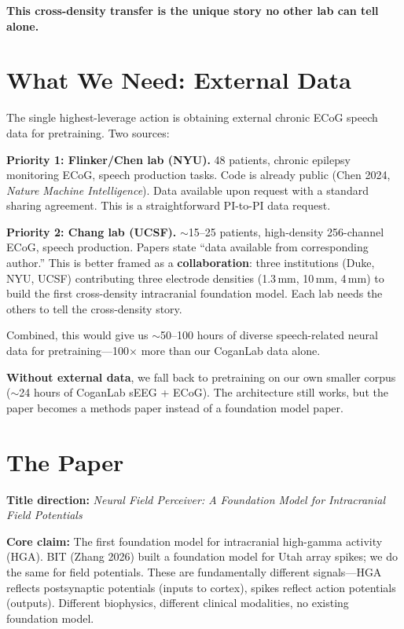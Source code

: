\documentclass[11pt,letterpaper]{article}
\begin{document}
\textbf{This cross-density transfer is the unique story no other lab can tell alone.}


\section{What We Need: External Data}

The single highest-leverage action is obtaining external chronic ECoG speech data for pretraining. Two sources:

\textbf{Priority 1: Flinker/Chen lab (NYU).} 48 patients, chronic epilepsy monitoring ECoG, speech production tasks. Code is already public (Chen 2024, \textit{Nature Machine Intelligence}). Data available upon request with a standard sharing agreement. This is a straightforward PI-to-PI data request.

\textbf{Priority 2: Chang lab (UCSF).} ${\sim}$15--25 patients, high-density 256-channel ECoG, speech production. Papers state ``data available from corresponding author.'' This is better framed as a \textbf{collaboration}: three institutions (Duke, NYU, UCSF) contributing three electrode densities (1.3\,mm, 10\,mm, 4\,mm) to build the first cross-density intracranial foundation model. Each lab needs the others to tell the cross-density story.

Combined, this would give us ${\sim}$50--100 hours of diverse speech-related neural data for pretraining---100$\times$ more than our CoganLab data alone.

\textbf{Without external data}, we fall back to pretraining on our own smaller corpus (${\sim}$24 hours of CoganLab sEEG + \textmu ECoG). The architecture still works, but the paper becomes a methods paper instead of a foundation model paper.


\section{The Paper}

\textbf{Title direction:} \textit{Neural Field Perceiver: A Foundation Model for Intracranial Field Potentials}

\textbf{Core claim:} The first foundation model for intracranial high-gamma activity (HGA). BIT (Zhang 2026) built a foundation model for Utah array spikes; we do the same for field potentials. These are fundamentally different signals---HGA reflects postsynaptic potentials (inputs to cortex), spikes reflect action potentials (outputs). Different biophysics, different clinical modalities, no existing foundation model.
\end{document}
